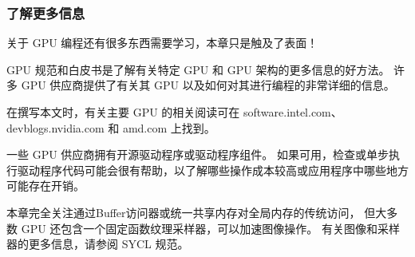 \subsubsection{了解更多信息}
关于 GPU 编程还有很多东西需要学习，本章只是触及了表面！

GPU 规范和白皮书是了解有关特定 GPU 和 GPU 架构的更多信息的好方法。 
许多 GPU 供应商提供了有关其 GPU 以及如何对其进行编程的非常详细的信息。

在撰写本文时，有关主要 GPU 的相关阅读可在 software.intel.com、devblogs.nvidia.com 和 amd.com 上找到。

一些 GPU 供应商拥有开源驱动程序或驱动程序组件。 
如果可用，检查或单步执行驱动程序代码可能会很有帮助，以了解哪些操作成本较高或应用程序中哪些地方可能存在开销。

本章完全关注通过Buffer访问器或统一共享内存对全局内存的传统访问，
但大多数 GPU 还包含一个固定函数纹理采样器，可以加速图像操作。 有关图像和采样器的更多信息，请参阅 SYCL 规范。